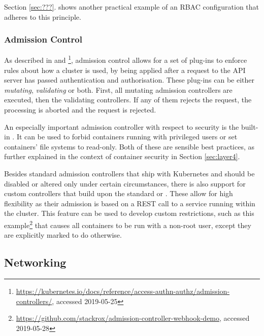 Section \ref{sec:???}. shows another practical example of an \ac{RBAC} configuration that adheres to this principle.



\subsubsection{Admission Control} \label{admissionControl}

As described in \cite{admissionControl} and \cite{k8sdocs}\footnote{\url{https://kubernetes.io/docs/reference/access-authn-authz/admission-controllers/}, accessed 2019-05-25}, admission control allows for a set of plug-ins to enforce rules about how a cluster is used, by being applied after a request to the API server has passed authentication and authorisation. These plug-ins can be either \textit{mutating}, \textit{validating} or both. First, all mutating admission controllers are executed, then the validating controllers. If any of them rejects the request, the processing is aborted and the request is rejected.

An especially important admission controller with respect to security is the built-in . It can be used to forbid containers running with privileged users or set containers' file systems to read-only. Both of these are sensible best practices, as further explained in the context of container security in Section \ref{sec:layer4}.

Besides standard admission controllers that ship with Kubernetes and should be disabled or altered only under certain circumstances, there is also support for custom controllers that build upon the standard  or . These allow for high flexibility as their admission is based on a REST call to a service running within the cluster. This feature can be used to develop custom restrictions, such as this example\footnote{\url{https://github.com/stackrox/admission-controller-webhook-demo}, accessed 2019-05-28} that causes all containers to be run with a non-root user, except they are explicitly marked to do otherwise. 

\subsection{Networking} \label{networking}


